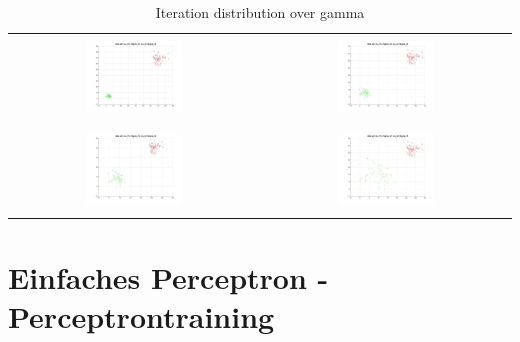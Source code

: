 \documentclass[]{report}
\begin{document}
\begin{table}[h]
\begin{tabular}{| c | c |}
\hline
 & \\
\includegraphics[width=0.4\textwidth]{./images/DataSet_100.jpg} & \includegraphics[width=0.4\textwidth]{./images/DataSet_200.jpg} \\
 & \\
\hline
 & \\
\includegraphics[width=0.4\textwidth]{./images/DataSet_300.jpg} & \includegraphics[width=0.4\textwidth]{./images/DataSet_400.jpg} \\
 & \\
\hline
\end{tabular}
\caption{Iteration distribution over gamma}
\label{tab:DataSets}
\end{table}

\chapter{Einfaches Perceptron - Perceptrontraining}
\end{document}
